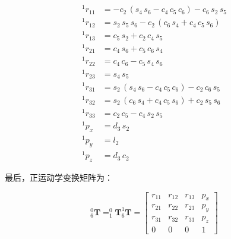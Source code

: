 \documentclass{homework}
\begin{document}
\begin{sol}
\begin{align*} 
  {^1}r_{11} &= -c_{2}\,\left(s_{4}\,s_{6}-c_{4}\,c_{5}\,c_{6}\right)-c_{6}\,s_{2}\,s_{5} \\ 
  {^1}r_{12} &= s_{2}\,s_{5}\,s_{6}-c_{2}\,\left(c_{6}\,s_{4}+c_{4}\,c_{5}\,s_{6}\right) \\ 
  {^1}r_{13} &= c_{5}\,s_{2}+c_{2}\,c_{4}\,s_{5} \\  
  {^1}r_{21} &= c_{4}\,s_{6}+c_{5}\,c_{6}\,s_{4} \\ 
  {^1}r_{22} &= c_{4}\,c_{6}-c_{5}\,s_{4}\,s_{6} \\ 
  {^1}r_{23} &= s_{4}\,s_{5} \\ 
  {^1}r_{31} &= s_{2}\,\left(s_{4}\,s_{6}-c_{4}\,c_{5}\,c_{6}\right)-c_{2}\,c_{6}\,s_{5} \\ 
  {^1}r_{32} &= s_{2}\,\left(c_{6}\,s_{4}+c_{4}\,c_{5}\,s_{6}\right)+c_{2}\,s_{5}\,s_{6} \\ 
  {^1}r_{33} &= c_{2}\,c_{5}-c_{4}\,s_{2}\,s_{5} \\ 
  {^1}p_x &= d_{3}\,s_{2} \\
  {^1}p_y &= l_{2} \\ 
  {^1}p_z &= d_{3}\,c_{2}
\end{align*}

最后，正运动学变换矩阵为：

\[
  _6^0\mathbf{T} = _1^0\mathbf{T} _6^1\mathbf{T} =
  \begin{bmatrix} 
    r_{11} & r_{12} & r_{13} & p_x \\ 
    r_{21} & r_{22} & r_{23} & p_y \\ 
    r_{31} & r_{32} & r_{33} & p_z \\ 
    0 & 0 & 0 & 1
  \end{bmatrix}
\] 


\end{sol}
\end{document}
